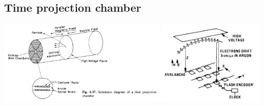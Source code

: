 \subsection{Time projection chamber}
\begin{center}
  \includegraphics[width=0.6\textwidth,valign=t]{figs/tpc1.png}
  \includegraphics[width=0.38\textwidth,valign=t]{figs/tpc2.png}
\end{center}
